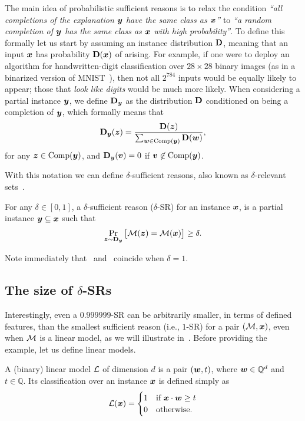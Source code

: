 The main idea of probabilistic sufficient reasons is to relax the condition \emph{``all completions of the explanation ${\bm{y}}$ have the same class as ${\bm{x}}$''} to \emph{``a random completion of ${\bm{y}}$ has the same class as ${\bm{x}}$ with high probability''}. To define this formally let us start by assuming an instance distribution $\mathbf{D}$, meaning that an input ${\bm{x}}$ has probability $\mathbf{D}({\bm{x}})$ of arising. For example, if one were to deploy an algorithm for handwritten-digit classification over $28 \times 28$ binary images (as in a binarized version of MNIST~\cite{deng2012mnist}), then not all $2^{784}$ inputs would be equally likely to appear; those that \emph{look like digits} would be much more likely.
When considering a partial instance ${\bm{y}}$, we define $\mathbf{D}_{{\bm{y}}}$ as the distribution $\mathbf{D}$ conditioned on being a completion of ${\bm{y}}$, which formally means that 
\[
	\mathbf{D}_{{\bm{y}}}({\bm{z}}) = \frac{\mathbf{D}({\bm{z}})}{\sum_{{\bm{w}} \in \operatorname{Comp}({\bm{y}})} \mathbf{D}({\bm{w}})},
\]
for any ${\bm{z}} \in \operatorname{Comp}({\bm{y}})$, and $\mathbf{D}_{{\bm{y}}}({\bm{v}}) = 0$ if ${\bm{v}} \not\in \operatorname{Comp}({\bm{y}})$.
 
With this notation we can define $\delta$-sufficient reasons, also known as $\delta$-relevant sets~\cite{Izza2021EfficientEW}.
\begin{definition}
	For any $\delta \in [0, 1]$, a $\delta$-sufficient reason ($\delta$-SR) for an instance ${\bm{x}}$, is a partial instance ${\bm{y}} \subseteq {\bm{x}}$ such that
	\[
		\Pr_{{\bm{z}} \sim \mathbf{D}_{{\bm{y}}}}\big[\mathcal{M}({\bm{z}}) = \mathcal{M}({\bm{x}})\big] \geq \delta.
	\]
	\label{def:delta-SR}
\end{definition}
%
Note immediately that~ and~ coincide when $\delta = 1$.
\subsection{The size of $\delta$-SRs}

Interestingly, even a $0.999999$-SR can be arbitrarily smaller, in terms of defined features, than the smallest sufficient reason (i.e., $1$-SR) for a pair $(\mathcal{M}, {\bm{x}})$, even when $\mathcal{M}$ is a linear model, as we will illustrate in~. Before providing the example, let us define linear models.

\begin{definition}
	A (binary) linear model $\mathcal{L}$ of dimension $d$ is a pair $({\bm{w}}, t)$, where ${\bm{w}} \in \mathbb{Q}^d$ and $t \in \mathbb{Q}$. Its classification over an instance ${\bm{x}}$ is defined simply as 
	\[
		\mathcal{L}({\bm{x}}) = \begin{cases}
			1 & \text{if } {\bm{x}} \cdot {\bm{w}} \geq t\\
			0 & \text{otherwise}.
		\end{cases}
	\]
	\label{def:linear-models}
\end{definition}

